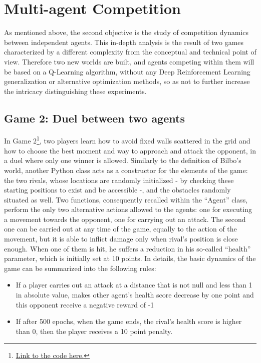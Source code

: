 \section{Multi-agent Competition}
As mentioned above, the second objective is the study of competition dynamics between independent agents. This in-depth analysis is the result of two games characterized by a different complexity from the conceptual and technical point of view. Therefore two new worlds are built, and agents competing within them will be based on a Q-Learning algorithm, without any Deep Reinforcement Learning generalization or alternative optimization methods, so as not to further increase the intricacy distinguishing these experiments.
\subsection{Game 2: Duel between two agents}
In Game 2\footnote{\href{https://github.com/moiraghif/DragonHunting/tree/master/Duel}{Link to the code here.}}, two players learn how to avoid fixed walls scattered in the grid and how to choose the best moment and way to approach and attack the opponent, in a duel where only one winner is allowed. Similarly to the definition of Bilbo's world, another Python class acts as a constructor for the elements of the game: the two rivals, whose locations are randomly initialized - by checking these starting positions to exist and be accessible -, and the obstacles randomly situated as well. Two functions, consequently recalled within the ``Agent'' class, perform the only two alternative actions allowed to the agents: one for executing a movement towards the opponent, one for carrying out an attack. The second one can be carried out at any time of the game, equally to the action of the movement, but it is able to inflict damage only when rival's position is close enough. When one of them is hit, he suffers a reduction in his so-called ``health'' parameter, which is initially set at 10 points. In details, the basic dynamics of the game can be summarized into the following rules:
\begin{itemize}[noitemsep, topsep=0ex]
  \item If a player carries out an attack at a distance that is not null and less than 1 in absolute value, makes other agent's health score decrease by one point and this opponent receive a negative reward of -1
  \item If after 500 epochs, when the game ends, the rival's health score is higher than 0, then the player receives a 10 point penalty.
\end{itemize}

